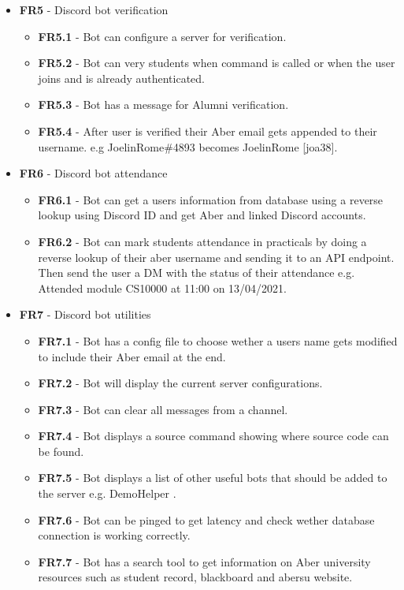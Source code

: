 \begin{itemize}
	\item \textbf{FR5} - Discord bot verification
	\begin{itemize}
		\item \textbf{FR5.1} - Bot can configure a server for verification.
		\item \textbf{FR5.2} - Bot can very students when command is called or when the user joins and is already authenticated.
		\item \textbf{FR5.3} - Bot has a message for Alumni verification.
		\item \textbf{FR5.4} - After user is verified their Aber email gets appended to their username. e.g JoelinRome\#4893 becomes JoelinRome [joa38].
	\end{itemize}

	\item \textbf{FR6} - Discord bot attendance
	\begin{itemize}
		\item \textbf{FR6.1} - Bot can get a users information from database using a reverse lookup using Discord ID and get Aber and linked Discord accounts.
		\item \textbf{FR6.2} - Bot can mark students attendance in practicals by doing a reverse lookup of their aber username and sending it to an API endpoint. Then send the user a DM with the status of their attendance e.g. Attended module CS10000 at 11:00 on 13/04/2021.
	\end{itemize}

	\item \textbf{FR7} - Discord bot utilities
	\begin{itemize}
		\item \textbf{FR7.1} - Bot has a config file to choose wether a users name gets modified to include their Aber email at the end.
		\item \textbf{FR7.2} - Bot will display the current server configurations.
		\item \textbf{FR7.3} - Bot can clear all messages from a channel.
		\item \textbf{FR7.4} - Bot displays a source command showing where source code can be found.
		\item \textbf{FR7.5} - Bot displays a list of other useful bots that should be added to the server e.g. DemoHelper \cite{demohelper}.
		\item \textbf{FR7.6} - Bot can be pinged to get latency and check wether database connection is working correctly.
		\item \textbf{FR7.7} - Bot has a search tool to get information on Aber university resources such as student record, blackboard and abersu website. 
	\end{itemize}


\end{itemize}
